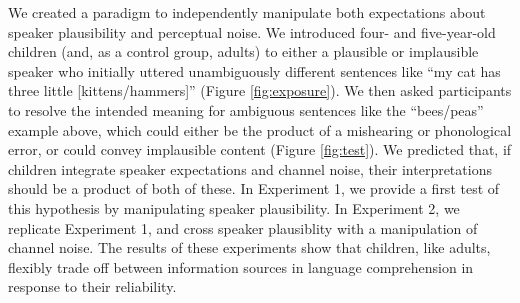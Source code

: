 \documentclass[man,floatsintext]{apa6}
\begin{document}
We created a paradigm to independently manipulate both expectations about speaker plausibility and perceptual noise. We introduced four- and five-year-old children (and, as a control group, adults) to either a plausible or implausible speaker who initially uttered unambiguously different sentences like ``my cat has three little [kittens/hammers]'' (Figure \ref{fig:exposure}). We then asked participants to resolve the intended meaning for ambiguous sentences like the ``bees/peas'' example above, which could either be the product of a mishearing or phonological error, or could convey implausible content (Figure \ref{fig:test}). We predicted that, if children integrate speaker expectations and channel noise, their interpretations should be a product of both of these. In Experiment 1, we provide a first test of this hypothesis by manipulating speaker plausibility. In Experiment 2, we replicate Experiment 1, and cross speaker plausiblity with a manipulation of channel noise. The results of these experiments show that children, like adults, flexibly trade off between information sources in language comprehension in response to their reliability.
\end{document}
